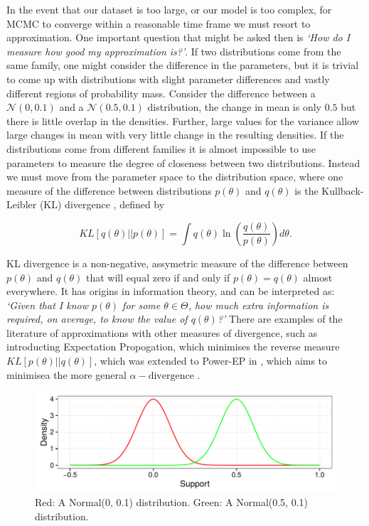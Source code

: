 \documentclass{article}\usepackage[]{graphicx}\usepackage[]{color}
\makeatletter
\def\maxwidth{ %
  \ifdim\Gin@nat@width>\linewidth
    \linewidth
  \else
    \Gin@nat@width
  \fi
}
\newenvironment{knitrout}{}{} %
\numberwithin{equation}{section}
\makeatother
\begin{document}
In the event that our dataset is too large, or our model is too complex, for MCMC to converge within a reasonable time frame we must resort to approximation. One important question that might be asked then is \textit{`How do I measure how good my approximation is?'}. If two distributions come from the same family, one might consider the difference in the parameters, but it is trivial to come up with distributions with slight parameter differences and vastly different regions of probability mass. Consider the difference between a $\mathcal{N}(0, 0.1)$ and a $\mathcal{N}(0.5, 0.1)$ distribution, the change in mean is only $0.5$ but there is little overlap in the densities. Further, large values for the variance allow large changes in mean with very little change in the resulting densities. If the distributions come from different families it is almost impossible to use parameters to measure the degree of closeness between two distributions. Instead we must move from the parameter space to the distribution space, where one measure of the difference between distributions $p(\theta)$ and $q(\theta)$ is the Kullback-Leibler (KL) divergence \citep{Kullback1951}, defined by

\begin{equation}
\label{KL-def}
KL[q(\theta)||p(\theta)] = \int q(\theta) \ln \left( \frac{q(\theta)}{p(\theta)}\right) d\theta.
\end{equation}

KL divergence is a non-negative, assymetric measure of the difference between $p(\theta)$ and $q(\theta)$ that will equal zero if and only if $p(\theta) = q(\theta)$ almost everywhere. It has origins in information theory, and can be interpreted as: \textit{`Given that I know $p(\theta)$ for some $\theta \in \Theta$, how much extra information is required, on average, to know the value of $q(\theta)$?'} There are examples of the literature of approximations with other measures of divergence, such as \citet{Minka2001} introducting Expectation Propogation, which minimises the reverse measure $KL[p(\theta)||q(\theta)]$, which was extended to Power-EP in \citet{Minka2004}, which aims to minimisea the more general $\alpha-\mbox{divergence}$ \citep{Amari1985}.
\vspace{3mm}

\begin{figure}[hb]
\begin{knitrout}
\color{fgcolor}
\includegraphics[width=\maxwidth]{figure/klnorm-1} 

\end{knitrout}
\caption{Red: A Normal(0, 0.1) distribution. Green: A Normal(0.5, 0.1) distribution.}
\end{figure}
\end{document}

